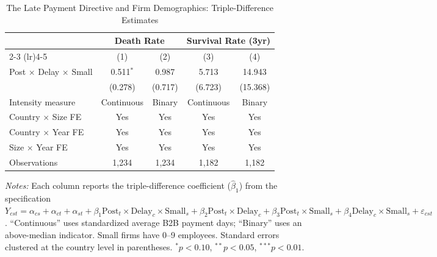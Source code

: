 \begin{table}[htbp]
\centering
\caption{The Late Payment Directive and Firm Demographics: Triple-Difference Estimates}
\label{tab:main}
\begin{tabular}{lcccc}
\hline\hline
 & \multicolumn{2}{c}{Death Rate} & \multicolumn{2}{c}{Survival Rate (3yr)} \\
\cmidrule(lr){2-3} \cmidrule(lr){4-5}
 & (1) & (2) & (3) & (4) \\
\hline
Post $\times$ Delay $\times$ Small & 0.511$^{*}$ & 0.987 & 5.713 & 14.943 \\
 & (0.278) & (0.717) & (6.723) & (15.368) \\
\hline
Intensity measure & Continuous & Binary & Continuous & Binary \\
Country $\times$ Size FE & Yes & Yes & Yes & Yes \\
Country $\times$ Year FE & Yes & Yes & Yes & Yes \\
Size $\times$ Year FE & Yes & Yes & Yes & Yes \\
Observations & 1,234 & 1,234 & 1,182 & 1,182 \\
\hline\hline
\end{tabular}
\begin{tablenotes}[flushleft]\footnotesize
\item \textit{Notes:} Each column reports the triple-difference coefficient ($\hat{\beta}_1$) from the specification $Y_{cst} = \alpha_{cs} + \alpha_{ct} + \alpha_{st} + \beta_1 \text{Post}_t \times \text{Delay}_c \times \text{Small}_s + \beta_2 \text{Post}_t \times \text{Delay}_c + \beta_3 \text{Post}_t \times \text{Small}_s + \beta_4 \text{Delay}_c \times \text{Small}_s + \varepsilon_{cst}$. ``Continuous'' uses standardized average B2B payment days; ``Binary'' uses an above-median indicator. Small firms have 0--9 employees. Standard errors clustered at the country level in parentheses. $^{*}p<0.10$, $^{**}p<0.05$, $^{***}p<0.01$.
\end{tablenotes}
\end{table}
